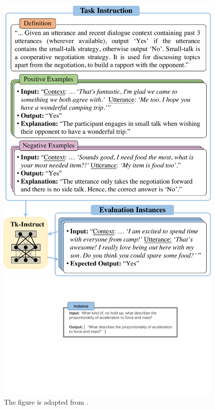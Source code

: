\begin{figure}[t]
  \centering
  \begin{minipage}[t]{0.48\textwidth}
    \centering
    \includegraphics[width=1\textwidth]{figures/supernatural_fig1_a.pdf}
  \end{minipage}%
  \hfill
  \begin{minipage}[t]{0.48\textwidth}
    \centering
    \includegraphics[width=1\textwidth]{figures/supernatural_fig1_b.pdf}
  \end{minipage}
  \caption{The figure is adapted from \citet{wang2022super}.}
  \label{fig:data_supernatural}
\end{figure}
